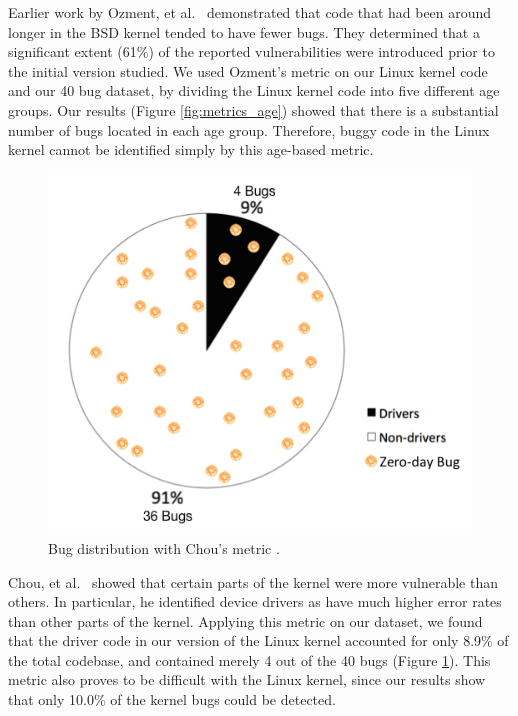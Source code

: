 Earlier work by Ozment, et al.~\cite{ozment2006milk} demonstrated that code that
had been around longer in the BSD kernel tended to have fewer bugs.
They determined that a significant extent (61\%) of the reported
vulnerabilities were 
introduced prior to the initial version studied. 
We used Ozment's metric on our Linux kernel code and our 40 bug dataset, 
by dividing the Linux kernel code into five different age groups. 
Our results (Figure \ref{fig:metrics_age}) showed that there is a substantial 
number of bugs located in each age group. 
Therefore, buggy code in the Linux kernel cannot be identified simply
by this age-based metric.


\begin{figure}
\centering
\includegraphics[width=0.9\columnwidth]{diagram/metrics_drivers.png}
\caption{\small Bug distribution with Chou's metric \cite{PittSFIeld}.}
\label{fig:metrics_drivers}
\end{figure}

Chou, et al.~\cite{PittSFIeld} showed that certain parts of the kernel
were more vulnerable than others. In particular, he identified device drivers as
have much higher error rates than other parts of the kernel.
Applying this metric on our dataset, we found that the driver code in our version
of the Linux kernel accounted for only 8.9\% of the total codebase, and contained
merely 4 out of the 40 bugs (Figure \ref{fig:metrics_drivers}). 
This metric also proves to be difficult with the
Linux kernel, since our results show that
only 10.0\% of the kernel bugs could be detected.

